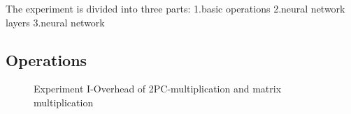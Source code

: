 \documentclass[letterpaper]{article} %
\begin{document}
    The experiment is divided into three parts: 1.basic operations 2.neural network layers 3.neural network

    \subsection{Operations}


    \begin{figure}[htbp]
        \caption{Experiment I-Overhead of 2PC-multiplication and matrix multiplication}
        \label{multiplication and matrix multiplication}

    \end{figure}
\end{document}
